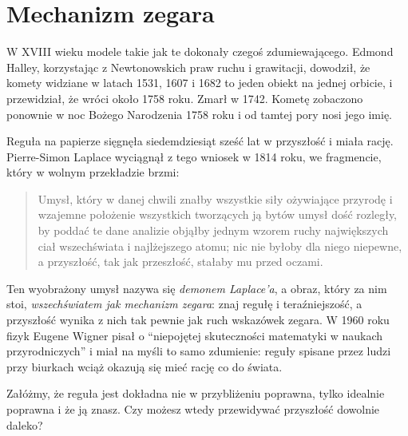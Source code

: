 \section{Mechanizm zegara}
\label{sec:ch01-clockwork}

\noindent
W XVIII wieku modele takie jak te dokonały czegoś zdumiewającego. Edmond
Halley, korzystając z Newtonowskich praw ruchu i grawitacji, dowodził, że
komety widziane w latach 1531, 1607 i 1682 to jeden obiekt na jednej
orbicie, i przewidział, że wróci około 1758 roku. Zmarł w 1742. Kometę
zobaczono ponownie w noc Bożego Narodzenia 1758 roku i od tamtej pory nosi
jego imię.

Reguła na papierze sięgnęła siedemdziesiąt sześć lat w przyszłość i miała
rację. Pierre-Simon Laplace wyciągnął z tego wniosek w 1814 roku, we
fragmencie, który w wolnym przekładzie brzmi:

\begin{quote}
Umysł, który w danej chwili znałby wszystkie siły ożywiające przyrodę i
wzajemne położenie wszystkich tworzących ją bytów \dash{} umysł dość
rozległy, by poddać te dane analizie \dash{} objąłby jednym wzorem ruchy
największych ciał wszechświata i najlżejszego atomu; nic nie byłoby dla
niego niepewne, a przyszłość, tak jak przeszłość, stałaby mu przed oczami.
\end{quote}

\noindent
Ten wyobrażony umysł nazywa się \emph{demonem Laplace'a}, a obraz, który za
nim stoi, \emph{wszechświatem jak mechanizm zegara}: znaj regułę i
teraźniejszość, a przyszłość wynika z nich tak pewnie jak ruch wskazówek
zegara. W 1960 roku fizyk Eugene Wigner pisał o \enquote{niepojętej
skuteczności matematyki w naukach przyrodniczych} i miał na myśli to samo
zdumienie: reguły spisane przez ludzi przy biurkach wciąż okazują się mieć
rację co do świata.


\begin{think}
Załóżmy, że reguła jest dokładna \dash{} nie w przybliżeniu poprawna, tylko
idealnie poprawna \dash{} i że ją znasz. Czy możesz wtedy przewidywać
przyszłość dowolnie daleko?
\end{think}

